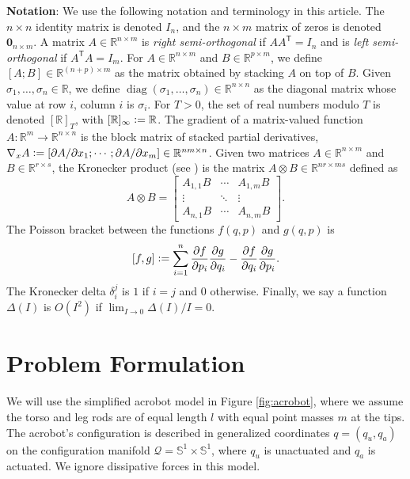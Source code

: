 \documentclass[journal,twoside,web, twocolumn]{ieeecolor}
\DeclareMathOperator{\Diag}{diag}
\DeclareMathOperator{\interior}{int}
\newcommand*{\diag}[1]{\Diag\left(#1\right)}
\newcommand*{\tpose}{^\mathsf{T}}
\newcommand*{\Rt}[1]{[\R]_{#1}}
\newcommand*{\R}{\mathbb{R}}
\newcommand*{\Sone}{\mathbb{S}^1}
\newcommand*{\Id}[1]{I_{#1}}
\newcommand*{\Zmat}[1]{\bm{0}_{#1}}
\newcommand*{\pdiff}[2]{\frac{\partial #1}{\partial #2}}
\newcommand*{\eqdef}{\vcentcolon=}
\begin{document}
\textbf{Notation}:
We use the following notation and terminology in this article.
The \(n \times n\) identity matrix is denoted \(\Id{n}\), and the \(n \times m\)
matrix of zeros is denoted \(\Zmat{n\times m}\).
A matrix \(A \in \R^{n \times m}\) is \textit{right semi-orthogonal} if
\(A A\tpose = \Id{n}\) and is \textit{left semi-orthogonal} if 
\(A\tpose A = \Id{m}\).
For \(A \in \R^{n\times m}\) and \(B \in \R^{p \times m}\),
we define \([A;B] \in \R^{(n+p)\times m}\) as the matrix obtained by stacking \(A\)
on top of \(B\). 
Given \(\sigma_1,\ldots,\sigma_n \in \R\), we define 
\(\diag{\sigma_1,\ldots,\sigma_n} \in \R^{n \times n}\) as the diagonal matrix
whose value at row \(i\), column \(i\) is \(\sigma_i\).
For \(T > 0\), the set of real numbers modulo \(T\) is denoted \(\Rt{T}\), with
\(\Rt{\infty} \eqdef \R\). %
The gradient of a matrix-valued function 
\(A : \R^m \rightarrow \R^{n\times n}\) is the block matrix of stacked partial
derivatives, 
\(\nabla_xA \eqdef [\partial A/\partial x_1; \cdots; \partial A/\partial x_m] \in
\R^{nm \times n}\).
Given two matrices \(A \in \R^{n \times m}\) and \(B \in \R^{r \times s}\), the
Kronecker product (see \cite{kronprod}) is the matrix  
\(A \otimes B \in \R^{nr \times ms}\)  defined as
\begin{equation}\label{eqn:kronprod}
    A \otimes B = \begin{bmatrix}
        A_{1,1}B & \cdots & A_{1,m} B \\
        \vdots & \ddots & \vdots \\
        A_{n,1} B & \cdots & A_{n,m} B
    \end{bmatrix} 
    .
\end{equation}
The Poisson bracket \cite{landau_mechanics} between the functions
\(f(q,p)\) and \(g(q,p)\) is
\begin{equation}\label{eqn:poisson-bracket}
    [f,g] \eqdef \sum \limits_{i=1}^n \pdiff{f}{p_i}\pdiff{g}{q_i} - 
        \pdiff{f}{q_i}\pdiff{g}{p_i}
    .
\end{equation}
The Kronecker delta \(\delta_i^j\) is \(1\) if \(i = j\) and \(0\)
otherwise.
Finally, we say a function \(\Delta(I)\) is \(O(I^2)\)
if \(\lim_{I \to 0} \Delta(I)/I = 0\).

\section{Problem Formulation}\label{sec:problem-formulation}
We will use the simplified acrobot model in Figure \ref{fig:acrobot}, where we assume the torso and leg rods are of equal length \(l\) with equal point masses \(m\) at the tips. The acrobot's configuration is described in generalized coordinates \(q=(q_u,q_a)\) on the configuration manifold \(\mathcal{Q} = \Sone \times \Sone\), where \(q_u\) is unactuated and  \(q_a\) is actuated. We ignore dissipative forces in this model.
\end{document}

